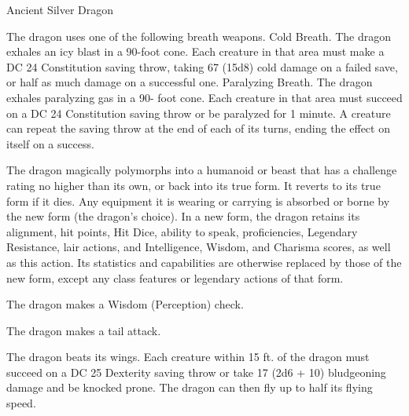 \begin{monsterbox}{Ancient Silver Dragon}
\begin{monsteraction}
The dragon uses one of the following breath weapons.
Cold Breath. The dragon exhales an icy blast in a 90-foot cone. Each creature in that area must make a DC 24 Constitution saving throw, taking 67 (15d8) cold damage on a failed save, or half as much damage on a successful one.
Paralyzing Breath. The dragon exhales paralyzing gas in a 90- foot cone. Each creature in that area must succeed on a DC 24 Constitution saving throw or be paralyzed for 1 minute. A creature can repeat the saving throw at the end of each of its turns, ending the effect on itself on a success.
\end{monsteraction}
\begin{monsteraction}
The dragon magically polymorphs into a humanoid or beast that has a challenge rating no higher than its own, or back into its true form. It reverts to its true form if it dies. Any equipment it is wearing or carrying is absorbed or borne by the new form (the dragon's choice).
In a new form, the dragon retains its alignment, hit points, Hit Dice, ability to speak, proficiencies, Legendary Resistance, lair actions, and Intelligence, Wisdom, and Charisma scores, as well as this action. Its statistics and capabilities are otherwise replaced by those of the new form, except any class features or legendary actions of that form.
\end{monsteraction}
\begin{monsteraction}[Detect]
The dragon makes a Wisdom (Perception) check.
\end{monsteraction}
\begin{monsteraction}
The dragon makes a tail attack.
\end{monsteraction}
\begin{monsteraction}
The dragon beats its wings. Each creature within 15 ft. of the dragon must succeed on a DC 25 Dexterity saving throw or take 17 (2d6 + 10) bludgeoning damage and be knocked prone. The dragon can then fly up to half its flying speed.
\end{monsteraction}
\end{monsterbox}